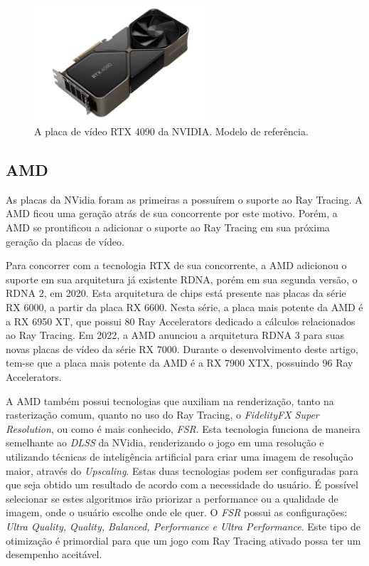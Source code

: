 \documentclass[journal]{IEEEtran}
\begin{document}
\begin{figure}[h]
  \centering
  \includegraphics[width=2.5in]{media/rtx4090.jpg}
  \caption{A placa de vídeo RTX 4090 da NVIDIA. Modelo de referência.}
  \label{img_rtx4090}
\end{figure}


\subsection{AMD}
As placas da NVidia foram as primeiras a possuírem o suporte ao Ray Tracing. A AMD
ficou uma geração atrás de sua concorrente por este motivo. Porém, a AMD se prontificou
a adicionar o suporte ao Ray Tracing em sua próxima geração da placas de vídeo.

Para concorrer com a tecnologia RTX de sua concorrente, a AMD adicionou o suporte em sua
arquitetura já existente RDNA, porém em sua segunda versão, o RDNA 2, em 2020. Esta arquitetura 
de chips está presente nas placas da série RX 6000, a partir da placa RX 6600. Nesta série,
a placa mais potente da AMD é a RX 6950 XT, que possui 80 Ray Accelerators dedicado a
cálculos relacionados ao Ray Tracing. Em 2022, a AMD anunciou a arquitetura RDNA 3 para
suas novas placas de vídeo da série RX 7000. Durante o desenvolvimento deste artigo,
tem-se que a placa mais potente da AMD é a RX 7900 XTX, possuindo 96 Ray Accelerators.

A AMD também possui tecnologias que auxiliam na renderização, tanto na rasterização comum,
quanto no uso do Ray Tracing, o \emph{FidelityFX Super Resolution}, ou como é mais conhecido,
\emph{FSR}. Esta tecnologia funciona de maneira semelhante ao \emph{DLSS} da NVidia, renderizando
o jogo em uma resolução e utilizando técnicas de inteligência artificial para criar uma imagem
de resolução maior, através do \emph{Upscaling}. Estas duas tecnologias podem ser configuradas
para que seja obtido um
resultado de acordo com a necessidade do usuário. É possível selecionar se estes algoritmos
irão priorizar a performance ou a qualidade de imagem, onde o usuário escolhe onde ele quer.
O \emph{FSR} possui as configurações: \emph{Ultra Quality, Quality, Balanced, Performance e
Ultra Performance}. Este tipo de otimização é primordial para que um jogo com Ray Tracing
ativado possa ter um desempenho aceitável.
\end{document}
